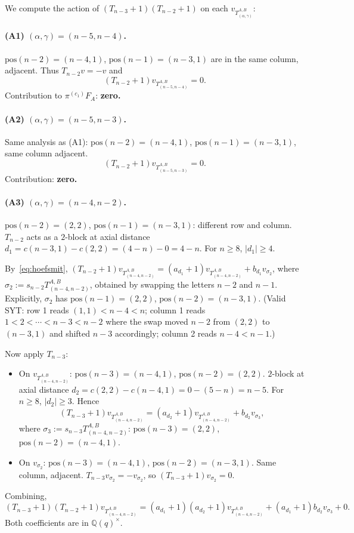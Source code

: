 \documentclass[11pt]{article}
\theoremstyle{definition}
\begin{document}
We compute the action of $(T_{n-3}{+}1)(T_{n-2}{+}1)$ on each
$v_{T^{A,B}_{(\alpha, \gamma)}}$:

\paragraph{(A1) $(\alpha, \gamma) = (n{-}5, n{-}4)$.}
$\mathrm{pos}(n-2) = (n-4, 1)$, $\mathrm{pos}(n-1) = (n-3, 1)$ are
in the same column, adjacent. Thus $T_{n-2} v = -v$ and
\[
   (T_{n-2}{+}1) v_{T^{A,B}_{(n-5,n-4)}} = 0.
\]
Contribution to $\pi^{(c_1)} F_A$: \textbf{zero.}

\paragraph{(A2) $(\alpha, \gamma) = (n{-}5, n{-}3)$.}
Same analysis as (A1): $\mathrm{pos}(n-2) = (n-4, 1)$,
$\mathrm{pos}(n-1) = (n-3, 1)$, same column adjacent.
\[
   (T_{n-2}{+}1) v_{T^{A,B}_{(n-5,n-3)}} = 0.
\]
Contribution: \textbf{zero.}

\paragraph{(A3) $(\alpha, \gamma) = (n{-}4, n{-}2)$.}
$\mathrm{pos}(n-2) = (2, 2)$, $\mathrm{pos}(n-1) = (n-3, 1)$:
different row and column. $T_{n-2}$ acts as a $2$-block at axial
distance $d_1 = c(n-3, 1) - c(2, 2) = (4-n) - 0 = 4-n$.
For $n \ge 8$, $|d_1| \ge 4$.

By~\eqref{eq:hoefsmit}, $(T_{n-2}{+}1) v_{T^{A,B}_{(n-4,n-2)}} =
(a_{d_1}{+}1) v_{T^{A,B}_{(n-4,n-2)}} + b_{d_1} v_{\sigma_2}$,
where $\sigma_2 := s_{n-2} T^{A,B}_{(n-4, n-2)}$, obtained by
swapping the letters $n-2$ and $n-1$. Explicitly,
$\sigma_2$ has $\mathrm{pos}(n-1) = (2, 2)$,
$\mathrm{pos}(n-2) = (n-3, 1)$. (Valid SYT: row 1 reads
$(1,1) < n-4 < n$; column 1 reads $1 < 2 < \cdots < n-3 < n-2$
where the swap moved $n-2$ from $(2,2)$ to $(n-3, 1)$ and shifted
$n-3$ accordingly; column 2 reads $n-4 < n-1$.)

Now apply $T_{n-3}$:
\begin{itemize}[leftmargin=2em,topsep=0.3em,itemsep=0.2em]
\item On $v_{T^{A,B}_{(n-4,n-2)}}$: $\mathrm{pos}(n-3) = (n-4, 1)$,
$\mathrm{pos}(n-2) = (2, 2)$. $2$-block at axial distance
$d_2 = c(2, 2) - c(n-4, 1) = 0 - (5-n) = n-5$. For $n \ge 8$,
$|d_2| \ge 3$. Hence
\[
   (T_{n-3}{+}1) v_{T^{A,B}_{(n-4,n-2)}}
   = (a_{d_2}{+}1) v_{T^{A,B}_{(n-4,n-2)}} + b_{d_2} v_{\sigma_3},
\]
where $\sigma_3 := s_{n-3} T^{A,B}_{(n-4, n-2)}$:
$\mathrm{pos}(n-3) = (2, 2)$, $\mathrm{pos}(n-2) = (n-4, 1)$.
\item On $v_{\sigma_2}$: $\mathrm{pos}(n-3) = (n-4, 1)$,
$\mathrm{pos}(n-2) = (n-3, 1)$. Same column, adjacent.
$T_{n-3} v_{\sigma_2} = -v_{\sigma_2}$, so
$(T_{n-3}{+}1) v_{\sigma_2} = 0$.
\end{itemize}
Combining,
\[
   (T_{n-3}{+}1)(T_{n-2}{+}1) v_{T^{A,B}_{(n-4,n-2)}}
   = (a_{d_1}{+}1)(a_{d_2}{+}1) v_{T^{A,B}_{(n-4,n-2)}}
     + (a_{d_1}{+}1) b_{d_2} v_{\sigma_3} + 0.
\]
Both coefficients are in $\mathbb{Q}(q)^\times$.
\end{document}
